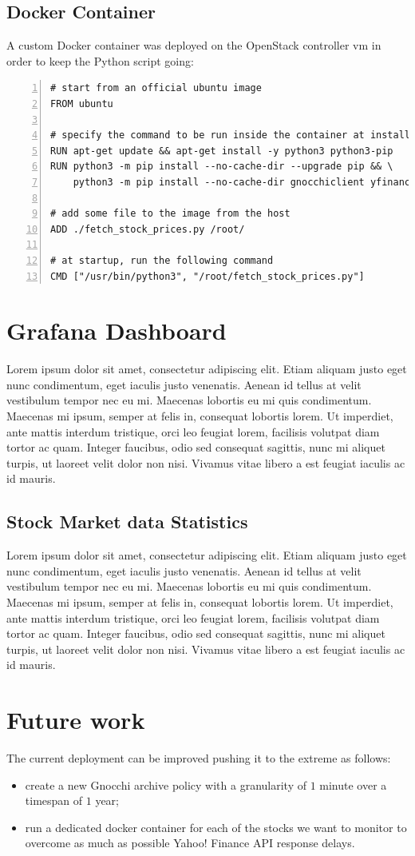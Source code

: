 \documentclass[11pt,a4paper]{article}
\begin{document}
\subsection{Docker Container}
A custom Docker container was deployed on the OpenStack controller vm in order to keep the Python script going:
\begin{lstlisting}[numbers=left]
# start from an official ubuntu image
FROM ubuntu

# specify the command to be run inside the container at installation
RUN apt-get update && apt-get install -y python3 python3-pip
RUN python3 -m pip install --no-cache-dir --upgrade pip && \
    python3 -m pip install --no-cache-dir gnocchiclient yfinance pandas

# add some file to the image from the host
ADD ./fetch_stock_prices.py /root/

# at startup, run the following command
CMD ["/usr/bin/python3", "/root/fetch_stock_prices.py"]
\end{lstlisting}
\section{Grafana Dashboard}
Lorem ipsum dolor sit amet, consectetur adipiscing elit. Etiam aliquam justo eget nunc condimentum, eget iaculis justo venenatis. Aenean id tellus at velit vestibulum tempor nec eu mi. Maecenas lobortis eu mi quis condimentum. Maecenas mi ipsum, semper at felis in, consequat lobortis lorem. Ut imperdiet, ante mattis interdum tristique, orci leo feugiat lorem, facilisis volutpat diam tortor ac quam. Integer faucibus, odio sed consequat sagittis, nunc mi aliquet turpis, ut laoreet velit dolor non nisi. Vivamus vitae libero a est feugiat iaculis ac id mauris.
\subsection{Stock Market data Statistics}
Lorem ipsum dolor sit amet, consectetur adipiscing elit. Etiam aliquam justo eget nunc condimentum, eget iaculis justo venenatis. Aenean id tellus at velit vestibulum tempor nec eu mi. Maecenas lobortis eu mi quis condimentum. Maecenas mi ipsum, semper at felis in, consequat lobortis lorem. Ut imperdiet, ante mattis interdum tristique, orci leo feugiat lorem, facilisis volutpat diam tortor ac quam. Integer faucibus, odio sed consequat sagittis, nunc mi aliquet turpis, ut laoreet velit dolor non nisi. Vivamus vitae libero a est feugiat iaculis ac id mauris.
\section{Future work}
The current deployment can be improved pushing it to the extreme as follows:
\begin{itemize}
    \item create a new Gnocchi archive policy with a granularity of $1$ minute over a timespan of $1$ year;
    \item run a dedicated docker container for each of the stocks we want to monitor to overcome as much as possible Yahoo! Finance API response delays.
\end{itemize}
\end{document}
